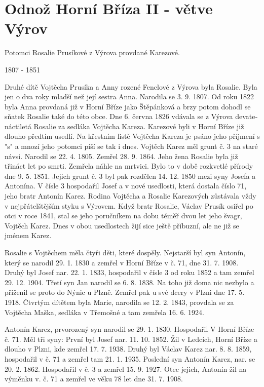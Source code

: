 \documentclass[../dejiny-rodu-prusiku.tex]{subfiles}
\begin{document}
\section{Odnož Horní Bříza II - větve Výrov}

Potomci Rosalie Prusíkové z Výrova provdané Karezové.

1807 - 1851

Druhé dítě Vojtěcha Prusíka a Anny rozené Fenclové z Výrova byla Rosalie. Byla jen o dva roky mladší než její sestra Anna. Narodila se 3. 9. 1807. Od roku 1822 byla Anna provdaná již v Horní Bříze jako Štěpánková a brzy potom dohodl se sňatek Rosalie také do této obce. Dne 6. června 1826 vdávala se z Výrova devate­náctiletá Rosalie za sedláka Vojtěcha Kareza. Karezo­vé byli v Horní Bříze již dlouho předtím usedlí. Na křestním listě Vojtěcha Kareza je psáno jeho příjmení s "s" a mnozí jeho potomci píší se tak i dnes. Vojtěch Karez měl grunt č. 3 na staré návsi. Narodil se 22. 4. 1805. Zemřel 28. 9. 1864. Jeho žena Rosalie byla již třináct let po smrti. Zemřela náhle na mrtvici. Bylo to v době rozkvetlé přírody dne 9. 5. 1851. Jejich grunt č. 3 byl pak rozdělen 14. 12. 1850 mezi syny Josefa a Antonína. V čís­le 3 hospodařil Josef a v nové usedlosti, která dosta­la číslo 71, jeho bratr Antonín Karez. Rodina Vojtěcha a Rosalie Karezových zůstávala vždy v nejpřátelštějším styku s Výrovem. Když bratr Rosalie, Václav Prusík osi­řel po otci v roce 1841, stal se jeho poručníkem na dobu téměř dvou let jeho švagr, Vojtěch Karez. Dnes v obou usedlostech žijí sice ještě příbuzní, ale ne již se jménem Karez.

Rosalie s Vojtěchem měla čtyři děti, které dospěly. Nejstarší byl syn Antonín, který se narodil 29. 1. 1830 a zemřel v Horní Bříze v č. 71, dne 31. 7. 1908. Druhý byl Josef nar. 22. 1. 1833, hospodařil v čísle 3 od roku 1852 a tam zemřel 29. 12. 1904. Třetí syn Jan narodil se 6. 8. 1838. Na toho již doma nic nezbylo a přiženil se proto do Nýnic u Plzně. Zemřel pak u své dcery v Plzni dne 17. 5. 1918. Čtvrtým dítětem byla Marie, narodila se 12. 2. 1843, provdala se za Vojtěcha Maška, sedláka v Třemošné a tam zemřela 16. 6. 1924.

Antonín Karez, prvorozený syn narodil se 29. 1. 1830. Hospodařil V Horní Bříze č. 71. Měl tři syny: První byl Josef nar. 11. 10. 1852. Žil v Ledcích, Horní Bříze a dlou­ho v Plzni, kde zemřel 17. 7. 1938. Druhý byl Václav Karez nar. 8. 8. 1859, hospodařil v č. 71 a zemřel tam 21. 1. 1935. Poslední syn Antonín Karez, nar. se 20. 2. 1862. Hospodařil v č. 3 a zemřel 15. 9. 1927. Otec jejich, Antonín žil na výměnku v. č. 71 a zemřel ve věku 78 let dne 31. 7. 1908.
\end{document}
